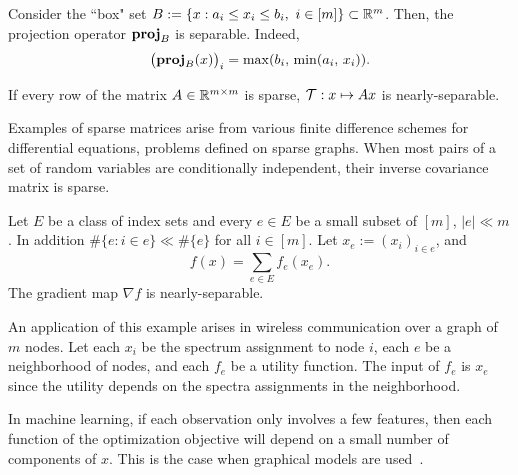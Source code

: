 \begin{example}\label{exp:proj-box}
Consider the ``box" set $B:=\{x:a_i\leq x_i\leq b_i,~i \in [m]\}\subset\mathbb{R}^m$. Then, the projection operator ${\mathbf{proj}}_{B}$ is separable. Indeed,
$$\big({\mathbf{proj}}_{B}(x)\big)_i=\max(b_i,\,\min(a_i,\, x_i)).$$
\end{example}


\begin{example} If every row of the matrix $A\in\mathbb{R}^{m\times m}$ is sparse,   ${\mathcal{T}} :x\mapsto Ax$ is nearly-separable.

Examples of sparse matrices arise from various finite difference schemes for differential equations, problems defined on sparse graphs. When most pairs of a set of random variables  are conditionally independent, their inverse covariance matrix is sparse.
\end{example}

\begin{example}
Let $E$ be a class of index sets and every $e\in E$ be a small subset of $[m]$, $|e|\ll m$. In addition $\#\{e:i\in e\}\ll \#\{e\}$ for all $i\in [m]$.
Let $x_e:=(x_i)_{i\in e}$, and
$$f(x) = \sum_{e \in E} f_e (x_e).$$
The gradient map $\nabla f$ is nearly-separable.


An application of this example arises in wireless communication over  a graph of $m$ nodes. Let each $x_i$ be the spectrum assignment to node $i$, each $e$ be a neighborhood of nodes,  and each   $f_e$ be a utility function. The input of $f_e$ is $x_e$ since the utility depends on the spectra assignments in the neighborhood.

In machine learning, if each observation only involves a few features, then each function of the optimization objective will depend on a  small number of components of $x$. This is the case when graphical models are used~\cite{rue2005gaussian,bengio2006label}. 
\end{example}

